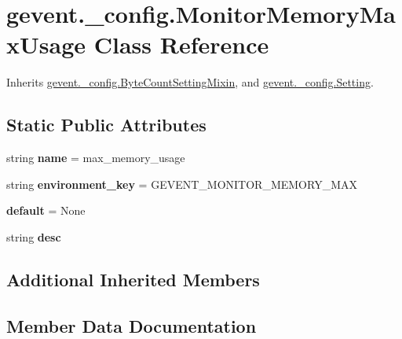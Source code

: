 \hypertarget{classgevent_1_1__config_1_1_monitor_memory_max_usage}{}\section{gevent.\+\_\+config.\+Monitor\+Memory\+Max\+Usage Class Reference}
\label{classgevent_1_1__config_1_1_monitor_memory_max_usage}


Inherits \hyperlink{classgevent_1_1__config_1_1_byte_count_setting_mixin}{gevent.\+\_\+config.\+Byte\+Count\+Setting\+Mixin}, and \hyperlink{classgevent_1_1__config_1_1_setting}{gevent.\+\_\+config.\+Setting}.

\subsection*{Static Public Attributes}
\begin{DoxyCompactItemize}
\item 
\mbox{\label{classgevent_1_1__config_1_1_monitor_memory_max_usage_a1cce90af8388db04e29544cd46e28340}} 
string {\bfseries name} = \textquotesingle{}max\+\_\+memory\+\_\+usage\textquotesingle{}
\item 
\mbox{\label{classgevent_1_1__config_1_1_monitor_memory_max_usage_adf74c6e0f6cbc14a726daa49f7ff8407}} 
string {\bfseries environment\+\_\+key} = \textquotesingle{}G\+E\+V\+E\+N\+T\+\_\+\+M\+O\+N\+I\+T\+O\+R\+\_\+\+M\+E\+M\+O\+R\+Y\+\_\+\+M\+AX\textquotesingle{}
\item 
\mbox{\label{classgevent_1_1__config_1_1_monitor_memory_max_usage_a17249d21e02c385397233e19144802cf}} 
{\bfseries default} = None
\item 
string {\bfseries desc}
\end{DoxyCompactItemize}
\subsection*{Additional Inherited Members}


\subsection{Member Data Documentation}
\mbox{\label{classgevent_1_1__config_1_1_monitor_memory_max_usage_ace89661bc43c8fb9be9f10f461088994}} 
